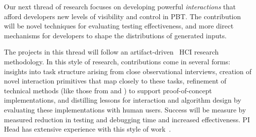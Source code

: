 


Our next thread of research focuses on developing powerful \emph{interactions} that afford developers new levels of visibility and control in PBT. The contribution will be novel techniques for evaluating testing effectiveness, and more direct mechanisms for developers to shape the distributions of generated inputs.

%
%

The projects in this thread
 will follow an
artifact-driven~\cite{ref:wobbrock2016research} HCI research methodology.
In this style of research, contributions come in several forms: insights into task
structure arising from close observational interviews, creation of novel
interaction primitives that map closely to these tasks, refinement of
technical methods (like those from  and
) to support proof-of-concept implementations,
and distilling
lessons for interaction and algorithm design by evaluating these
implementations
with human users. Success will be measure by measured
reduction in
testing and debugging time and increased effectiveness.
PI Head has extensive experience with this style of work~\cite{ref:head2015tutorons,ref:suzuki2017tracediff,ref:head2017writing,ref:head2018when,ref:head2018interactive,ref:head2019managing,ref:head2020composing}.

